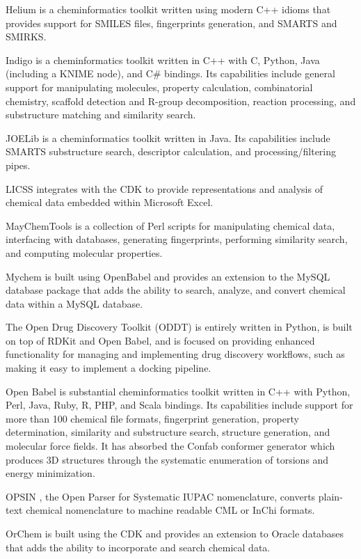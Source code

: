 Helium is a cheminformatics toolkit written using modern C++ idioms that provides support for SMILES files, fingerprints generation, and SMARTS and SMIRKS.

Indigo \cite{Pavlov_2011} is a cheminformatics toolkit written in C++ with C, Python, Java (including a KNIME node), and C\# bindings.  Its capabilities include general support for manipulating molecules, property calculation, combinatorial chemistry, scaffold detection and R-group decomposition, reaction processing, and substructure matching and similarity search.

JOELib is a cheminformatics toolkit written in Java. Its capabilities include SMARTS substructure search, descriptor calculation, and processing/filtering pipes.

LICSS \cite{Lawson_2012} integrates with the CDK to provide representations and analysis of chemical data embedded within Microsoft Excel.

MayChemTools is a collection of Perl scripts for manipulating chemical data, interfacing with databases, generating fingerprints, performing similarity search, and computing molecular properties.

Mychem is built using OpenBabel and provides an extension to the MySQL database package that adds the ability to search, analyze, and convert chemical data within a MySQL database.

The Open Drug Discovery Toolkit (ODDT) \cite{W_jcikowski_2015} is entirely written in Python, is built on top of RDKit and Open Babel, and is focused on providing enhanced functionality for managing and implementing drug discovery workflows, such as making it easy to implement a docking pipeline. 

Open Babel \cite{O_Boyle_2011} is substantial cheminformatics toolkit written in C++ with Python, Perl, Java, Ruby, R, PHP, and Scala bindings.  Its capabilities include support for more than 100 chemical file formats, fingerprint generation, property determination, similarity and substructure search, structure generation, and molecular force fields.  It has absorbed the Confab \cite{confab} conformer generator which produces 3D structures through the systematic enumeration of torsions and energy minimization.

OPSIN \cite{Lowe_2011}, the Open Parser for Systematic IUPAC nomenclature, converts plain-text chemical nomenclature to machine readable CML or InChi formats.

OrChem is built using the CDK and provides an extension to Oracle databases that adds the ability to incorporate and search chemical data.

